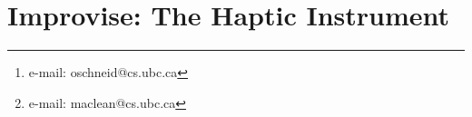 \chapter{Improvise: The Haptic Instrument}
\label{ch:hapticinstrument}








\author{Oliver S. Schneider\thanks{e-mail: oschneid@cs.ubc.ca} \qquad \qquad Karon E. MacLean\thanks{e-mail: maclean@cs.ubc.ca}\\ %
        \scriptsize Department of Computer Science \\
        \scriptsize University of British Columbia, Vancouver, Canada
}


